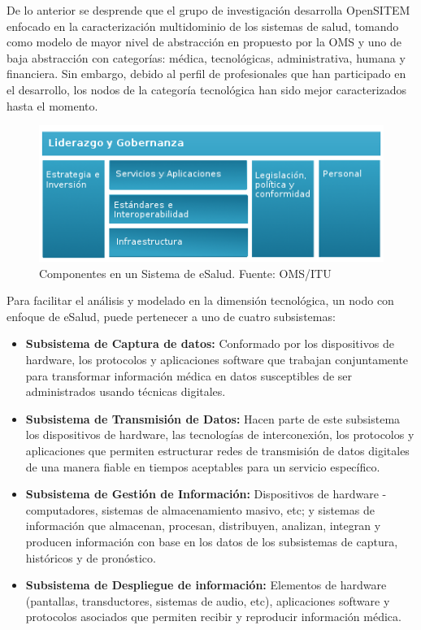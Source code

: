 De lo anterior se desprende que el grupo de investigación desarrolla OpenSITEM enfocado en la caracterización multidominio de los sistemas de salud, tomando como modelo de mayor nivel de abstracción en propuesto por la OMS y uno de baja abstracción con categorías: médica, tecnológicas, administrativa, humana y financiera. Sin embargo, debido al perfil de profesionales que han participado en el desarrollo, los nodos de la categoría tecnológica han sido mejor caracterizados hasta el momento.

\begin{figure}
 \centering
 \includegraphics{red_1.png}
 \caption{Componentes en un Sistema de eSalud. Fuente: OMS/ITU}
 \label{subcomponentes}
\end{figure}

Para facilitar el análisis y modelado en la dimensión tecnológica, un nodo con enfoque de eSalud, puede pertenecer a uno de cuatro subsistemas: \cite{aparicio2003}

\begin{itemize}
 \item \textbf{Subsistema de Captura de datos:} Conformado por los dispositivos de hardware, los protocolos y aplicaciones software que trabajan conjuntamente para transformar información médica en datos susceptibles de ser administrados usando técnicas digitales.
 \item \textbf{Subsistema de Transmisión de Datos:} Hacen parte de este subsistema los dispositivos de hardware, las tecnologías de interconexión, los protocolos y aplicaciones que permiten estructurar redes de transmisión de datos digitales de una manera fiable en tiempos aceptables para un servicio específico.
 \item \textbf{Subsistema de Gestión de Información:} Dispositivos de hardware - computadores, sistemas de almacenamiento masivo, etc; y  sistemas de información que almacenan, procesan, distribuyen, analizan, integran y producen información con base en los datos de los subsistemas de captura, históricos y de pronóstico.
 \item \textbf{Subsistema de Despliegue de información:} Elementos de hardware (pantallas, transductores, sistemas de audio, etc), aplicaciones software y protocolos asociados que permiten recibir y reproducir información médica. 
\end{itemize}

